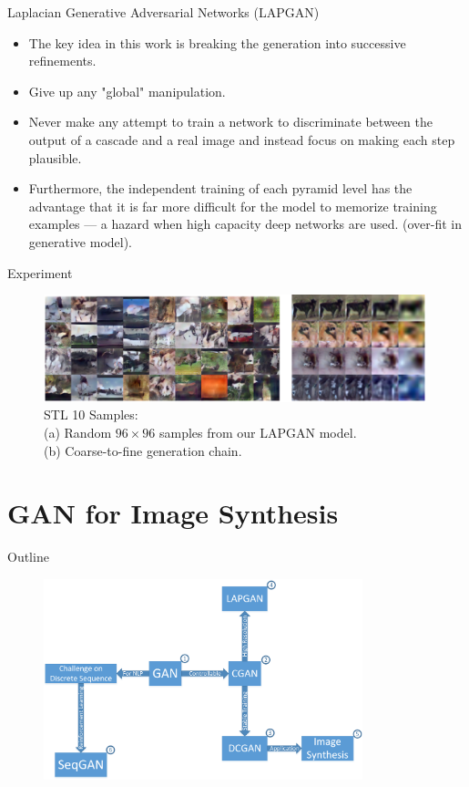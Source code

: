 \documentclass[10pt]{beamer}
\newcommand{\subtitlepage}[3]{\title{#1}\subtitle{#2}\author{#3}\date{}\begin{frame}[plain]\titlepage\end{frame}}
\begin{document}
	\begin{frame}{Laplacian Generative Adversarial Networks (LAPGAN)}
		\begin{itemize}
			\item The key idea in this work is breaking the generation into successive refinements.
			\pause
			\item Give up any "global" manipulation.
			\pause
			\item Never make any attempt to train a network to discriminate between the output of a cascade and a real image and instead focus on making each step plausible.
			\pause
			\item Furthermore, the independent training of each pyramid level has the advantage that it is far more difficult for the model to memorize training examples --- a hazard when high capacity deep networks are used. (over-fit in generative model).
		\end{itemize}
	\end{frame}

	\begin{frame}{Experiment}
		\begin{figure}
			\includegraphics[width=30em]{figures/LAPGAN-experiment.png}
			\caption{STL 10 Samples: \\(a) Random $96\times96$ samples from our LAPGAN model. \\(b) Coarse-to-fine generation chain.}
		\end{figure}
	\end{frame}
	
	\part{GAN for Image Synthesis}
	\begin{frame}{Outline}
		\begin{figure}
			\includegraphics[width=25em]{figures/outline.png}
		\end{figure}
	\end{frame}
	\subtitlepage{}{Generative Adversarial Text to Image Synthesis}{Scott Reed, Zeynep Akata, Xinchen Yan, Lajanugen Logeswaran, Bernt Schiele, Honglak Lee\\ICML2016+JMLR Vol.48\\arXiv: 1605.05396}
	
\end{document}
